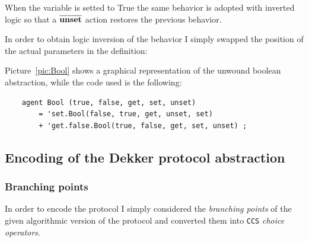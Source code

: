 \documentclass[10pt,a4paper]{article}
\newcommand{\CCS}{{\tt CCS}}
\newcommand{\Action}[1]{{\tt \bf {#1}}}
\newcommand{\CoAction}[1]{$\overline{\mbox{\Action{#1}}}$}
\begin{document}
        When the variable is setted to True the same behavior is adopted
        with inverted logic so that a \CoAction{unset} action restores the
        previous behavior.

        In order to obtain logic inversion of the behavior I simply
        swapped the position of the actual parameters in the definition:

        Picture~\ref{pic:Bool} shows a graphical representation of the
        unwound boolean abstraction, while the code used is the
        following:
        \begin{verbatim}
    agent Bool (true, false, get, set, unset)
        = 'set.Bool(false, true, get, unset, set)
        + 'get.false.Bool(true, false, get, set, unset) ;
        \end{verbatim}

    \subsection{Encoding of the Dekker protocol abstraction}

        \subsubsection{Branching points}
        \label{subsub:BranchingPoints}

            In order to encode the protocol I simply considered the
            \emph{branching points} of the given algorithmic version of
            the protocol and converted them into \CCS{} \emph{choice
            operators}.
\end{document}
